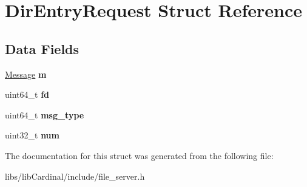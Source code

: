 \hypertarget{structDirEntryRequest}{}\section{Dir\+Entry\+Request Struct Reference}
\label{structDirEntryRequest}
\subsection*{Data Fields}
\begin{DoxyCompactItemize}
\item 
\hyperlink{structMessage}{Message} {\bfseries m}\hypertarget{structDirEntryRequest_a5f7494c8acdfebda89ba45641bd378c9}{}\label{structDirEntryRequest_a5f7494c8acdfebda89ba45641bd378c9}

\item 
uint64\+\_\+t {\bfseries fd}\hypertarget{structDirEntryRequest_a97d3b144397f968e796a6f44a1807887}{}\label{structDirEntryRequest_a97d3b144397f968e796a6f44a1807887}

\item 
uint64\+\_\+t {\bfseries msg\+\_\+type}\hypertarget{structDirEntryRequest_a52ef38da31e0254bb8dd3dc38c2e7256}{}\label{structDirEntryRequest_a52ef38da31e0254bb8dd3dc38c2e7256}

\item 
uint32\+\_\+t {\bfseries num}\hypertarget{structDirEntryRequest_a890633bd941bea0be9ae55f17c79c200}{}\label{structDirEntryRequest_a890633bd941bea0be9ae55f17c79c200}

\end{DoxyCompactItemize}


The documentation for this struct was generated from the following file\+:\begin{DoxyCompactItemize}
\item 
libs/lib\+Cardinal/include/file\+\_\+server.\+h\end{DoxyCompactItemize}
